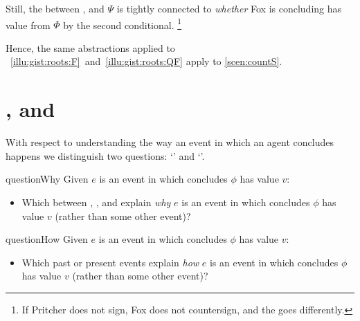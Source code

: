 \begin{note}
  Still, the \ros{} between ,  and \(\Psi\) is tightly connected to \emph{whether} Fox is concluding  has value  from \(\Phi\) by the second conditional.%
  \footnote{
    If Pritcher does not sign, Fox does not countersign, and the \scen{} goes differently.
  }

  Hence, the same abstractions applied to ~\ref{illu:gist:roots:F}~and~\ref{illu:gist:roots:QF} apply to \autoref{scen:countS}.
\end{note}



\section*{\qWhy{}, \qHow{} and \issueInclusion{}}
\label{cha:intro:why-how}


\begin{note}
  With respect to understanding the way an event in which an agent concludes happens we distinguish two questions:
  `\qWhy{}' and `\qHow{}'.

  \begin{question}{questionWhy}{\qWhy{}}
    Given \(e\) is an event in which \vAgent{} concludes \(\phi\) has value \(v\):
    \begin{itemize}
    \item
      Which \ros{} between , , and  explain \emph{why} \(e\) is an event in which \vAgent{} concludes \(\phi\) has value \(v\) (rather than some other event)?
    \end{itemize}
    \vspace{-1.5\baselineskip}
  \end{question}

  \begin{question}{questionHow}{\qHow{}}
    \label{q:how}
    Given \(e\) is an event in which \vAgent{} concludes \(\phi\) has value \(v\):
    \begin{itemize}
    \item
      Which past or present events explain \emph{how} \(e\) is an event in which \vAgent{} concludes \(\phi\) has value \(v\) (rather than some other event)?
    \end{itemize}
    \vspace{-1.5\baselineskip}
  \end{question}
\end{note}


